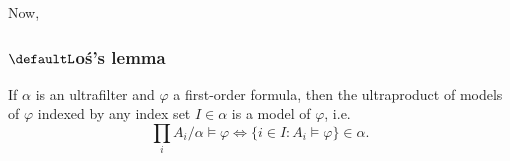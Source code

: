 Now, \cite{Hirsch}

\subsubsection*{$\defaultL$o\'s's lemma}
\begin{thm*}
If $\alpha$ is an ultrafilter and $\varphi$ a first-order formula, then the ultraproduct of models of $\varphi$ indexed by any index set $I\in \alpha$ is a model of $\varphi$, i.e. \[\prod_i A_i / \alpha\models\varphi\Leftrightarrow\{i\in I: A_i\models\varphi\}\in \alpha.\]
\end{thm*}





